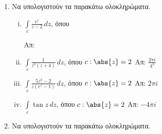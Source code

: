 



\pagestyle{askhseis}
\everymath{\displaystyle}



\begin{center}
  \minibox{\large\bfseries \textcolor{Col1}{Ασκήσεις Ολοκληρώματα}}
\end{center}

\vspace{\baselineskip} 

\begin{enumerate}

  \item Να υπολογιστούν τα παρακάτω ολοκληρώματα.

    \begin{enumerate}[i)]
      \item $ \int \limits_c\frac{e^{z}}{z-2} \,{dz} $, \quad όπου 
        \hfill Απ: 
      \item $ \int \limits_{c}\frac{1}{z^{3}(z+4)} \,{dz} $, \quad όπου $c:\abs{z}=2 $ 
        \hfill Απ: $ \frac{2 \pi i}{4^{3}} $  
      \item $\int\limits_c\frac{5z^2-2}{z(e^z-1)}\,dz$, \quad όπου $c:\abs{z}=2$ 
        \hfill Απ: $2\pi i$
      \item $\int\limits_c\tan z\,dz$, \quad όπου $c:\abs{z}=2$ \hfill Απ: $-4\pi i$
    \end{enumerate}

  \item Να υπολογιστούν τα παρακάτω ολοκληρώματα.


\end{enumerate}
